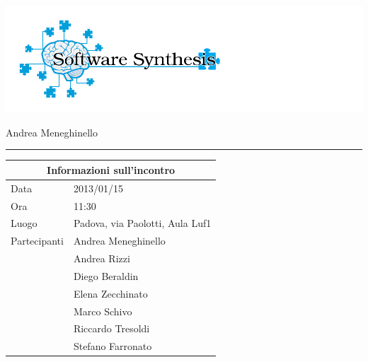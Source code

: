 \documentclass[a4paper,10pt,openright]{article}
\begin{document}
\includegraphics[width=1.5\textwidth]{logo}

\begin{center}

\begin{Large}
\hspace{1.2cm}{Verbale d'incontro 2013/01/15}
\newline
\end{Large}

\begin{small}
	Andrea Meneghinello
\end{small}

\noindent\rule{\textwidth}{0.4pt}
\newline

\begin{tabular}{ll}
\toprule
\multicolumn{2}{c}{\sffamily Informazioni sull'incontro}\\
\midrule
Data & 2013/01/15 \\
Ora & 11:30 \\
Luogo & Padova, via Paolotti, Aula Luf1 \\
Partecipanti & Andrea Meneghinello \\ & Andrea Rizzi \\& Diego Beraldin \\& Elena Zecchinato\\   & Marco Schivo \\ & Riccardo Tresoldi \\ & Stefano Farronato \\
\bottomrule
\end{tabular}

\end{center}
\end{document}
